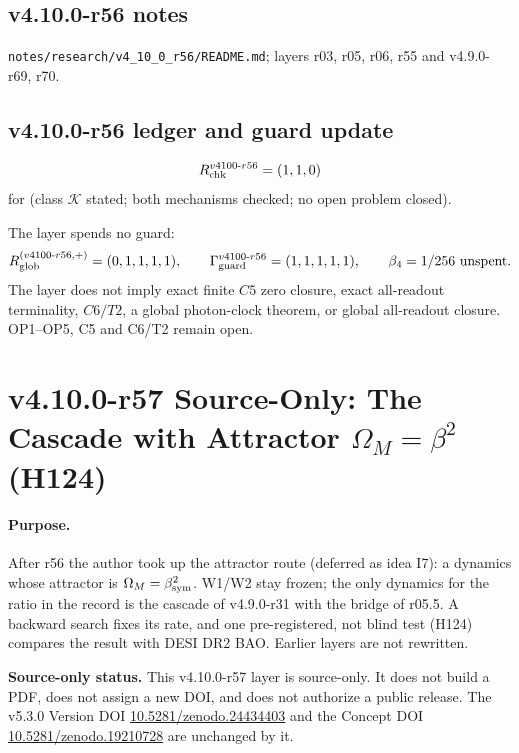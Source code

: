 \subsection*{v4.10.0-r56 notes}
\label{subsec:v4100-r56-notes}

\texttt{notes/\allowbreak research/\allowbreak v4\_10\_0\_r56/\allowbreak README.md}; layers r03, r05, r06, r55 and v4.9.0-r69, r70.

\subsection*{v4.10.0-r56 ledger and guard update}
\label{subsec:v4100-r56-ledger-guard}

\[
R_{\rm chk}^{v4100\text{-}r56}=(1,1,0)
\]
for (class \(\mathcal K\) stated; both mechanisms checked; no open problem closed).

The layer spends no guard:
\[
R_{\rm glob}^{(v4100\text{-}r56,+)}=(0,1,1,1,1),
\qquad
\Gamma_{\rm guard}^{v4100\text{-}r56}=(1,1,1,1,1),
\qquad
\beta_4=1/256\ \text{unspent}.
\]
The layer does not imply exact finite \(C5\) zero closure, exact all-readout terminality, \(C6/T2\), a global photon-clock theorem,
or global all-readout closure.  OP1--OP5, C5 and C6/T2 remain open.
\clearpage
\section*{v4.10.0-r57 Source-Only: The Cascade with Attractor \texorpdfstring{\(\Omega_M=\beta^2\)}{Omega\_M = beta\^2} (H124)}
\label{sec:v4100-r57-cascade-attractor}

\paragraph{Purpose.}
After r56 the author took up the attractor route (deferred as idea I7): a dynamics whose attractor is \(\Omega_M=\beta_{\rm sym}^2\).  W1/W2 stay frozen; the only
dynamics for the ratio in the record is the cascade of v4.9.0-r31 with the bridge of r05.5.  A backward search fixes its rate, and one pre-registered,
not blind test (H124) compares the result with DESI DR2 BAO.  Earlier layers are not rewritten.

\noindent\textbf{Source-only status.}
This v4.10.0-r57 layer is source-only.  It does not build a PDF, does not assign a new DOI,
and does not authorize a public release.  The v5.3.0 Version DOI
\href{https://doi.org/10.5281/zenodo.24434403}{10.5281/zenodo.24434403} and the Concept DOI
\href{https://doi.org/10.5281/zenodo.19210728}{10.5281/zenodo.19210728} are unchanged by it.

